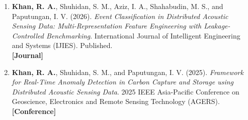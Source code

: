 \begin{enumerate}[label=\arabic*.]
    \justifying

    \item \textbf{Khan, R. A.}, Shuhidan, S. M., Aziz, I. A., Shahabudin, M. S., and Paputungan, I. V. (2026). \textit{Event Classification in Distributed Acoustic Sensing Data: Multi-Representation Feature Engineering with Leakage-Controlled Benchmarking}. International Journal of Intelligent Engineering and Systems (IJIES). Published. \\ \textbf{[Journal]}

    \item \textbf{Khan, R. A.}, Shuhidan, S. M., and Paputungan, I. V. (2025). \textit{Framework for Real-Time Anomaly Detection in Carbon Capture and Storage using Distributed Acoustic Sensing Data}. 2025 IEEE Asia-Pacific Conference on Geoscience, Electronics and Remote Sensing Technology (AGERS). \\ \textbf{[Conference]}

\end{enumerate}
